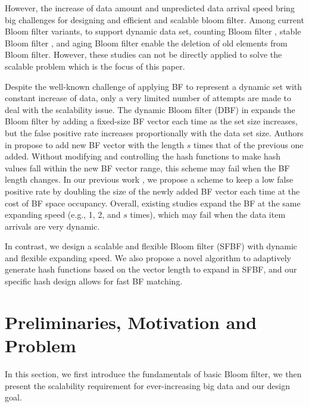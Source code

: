 \documentclass[10pt,journal,letterpaper]{IEEEtran}
\begin{document}

However, the increase of data amount and unpredicted data arrival speed bring big challenges for designing and efficient and scalable bloom filter. Among current Bloom filter variants, to support dynamic data set, counting Bloom filter \cite{fan2000summary}, stable Bloom filter \cite{deng2006approximately}, and aging Bloom filter \cite{yoon2010aging} enable the deletion of old elements from Bloom filter. However, these studies can not be directly applied to solve the scalable problem which is the focus of this paper.


Despite the well-known challenge of applying BF to represent a dynamic set with constant increase of data, only a very limited number of attempts are made to deal with the scalability issue.
 The dynamic Bloom filter (DBF) in \cite{guo2006theory, wei2010mad2} expands the Bloom filter by adding a fixed-size BF vector each time as the set size increases, but the false positive rate increases proportionally with the data set size. Authors in \cite{almeida2007scalable} propose to add new BF vector with the length $s$ times that of the previous one added. Without modifying and controlling the hash functions to make hash values fall within the new BF vector range, this scheme may fail when the BF length changes.
  In our previous work \cite{xie2007scalable}, we propose a scheme to keep a low false positive rate by doubling the size of the newly added BF vector each time at the cost of BF space occupancy.  Overall, existing studies expand the BF at the same expanding speed (e.g., 1, 2, and $s$ times), which may fail when the data item arrivals are very dynamic.

In contrast, we design a scalable and flexible Bloom filter (SFBF) with dynamic and flexible expanding speed. We also propose a novel algorithm to adaptively generate hash functions based on the vector length to expand in SFBF, and our specific hash design allows for fast BF matching.

\section{Preliminaries, Motivation and Problem}
\label{sec:Review of Bloom filter}
In this section, we first introduce the fundamentals of basic Bloom filter, we then present the scalability requirement for ever-increasing big data and our design goal.
\end{document}
